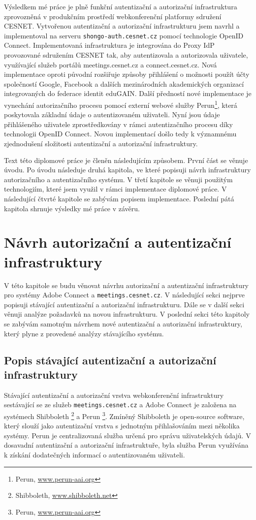 \documentclass[
  printed, %
  twoside, %
  table,   %
  nolof,     %
  nolot,     %
]{fithesis3}
\begin{document}
Výsledkem mé práce je plně funkční autentizační a autorizační infrastruktura zprovozněná v produkčním prostředí webkonferenční platformy sdružení CESNET. Vytvořenou autentizační a autorizační infrastrukturu jsem navrhl a implementoval na serveru \texttt{shongo-auth.cesnet.cz} pomocí technologie OpenID Connect. Implementovaná infrastruktura je integrována do Proxy IdP provozované sdružením CESNET tak, aby autentizovala a autorizovala uživatele, využívající služeb portálů meetings.cesnet.cz a connect.cesnet.cz. Nová implementace oproti původní rozšiřuje způsoby přihlášení o možnosti použít účty společností Google, Facebook a dalších mezinárodních akademických organizací integrovaných do federace identit eduGAIN. Další předností nové implementace je vynechání autorizačního procesu pomocí externí webové služby Perun\footnote{Perun, \url{www.perun-aai.org}}, která poskytovala základní údaje o autentizovaném uživateli. Nyní jsou údaje přihlášeného uživatele zprostředkovány v rámci autentizačního procesu díky technologii OpenID Connect. Novou implementací došlo tedy k významnému zjednodušení složitosti autentizační a autorizační infrastruktury. \par

Text této diplomové práce je členěn následujícím způsobem. První část se věnuje úvodu. Po úvodu následuje druhá kapitola, ve které popisuji návrh infrastruktury autorizačního a autentizačního systému. V třetí kapitole se věnuji použitým technologiím, které jsem využil v rámci implementace diplomové práce. V následující čtvrté kapitole se zabývám popisem implementace. Poslední pátá kapitola shrnuje výsledky mé práce v závěru. 

\chapter{Návrh autorizační a autentizační infrastruktury}
V této kapitole se budu věnovat návrhu autorizační a autentizační infrastruktury pro systémy Adobe Connect a \texttt{meetings.cesnet.cz}. V následující sekci nejprve popisuji stávající autentizační a autorizační infrastrukturu. Dále se v další sekci věnuji analýze požadavků na novou infrastrukturu. V poslední sekci této kapitoly se zabývám samotným návrhem nové autentizační a autorizační infrastruktury, který plyne z provedené analýzy stávajícího systému.    

\section{Popis stávající autentizační a autorizační infrastruktury}
Stávající autentizační a autorizační vrstva webkonferenční infrastruktury sestávající se ze služeb \texttt{meetings.cesnet.cz} a Adobe Connect je založena na systémech Shibboleth \footnote{Shibboleth, \url{www.shibboleth.net}} a Perun \footnote{Perun, \url{www.perun-aai.org}}. Zmíněný Shibboleth je open-source software, který slouží jako autentizační vrstva s jednotným přihlašováním mezi několika systémy. Perun je centralizovaná služba určená pro správu uživatelských údajů. V dosavadní autentizační a autorizační infrastruktuře, byla služba Perun využívána k získání dodatečných informací o autentizovaném uživateli. \par
\end{document}

